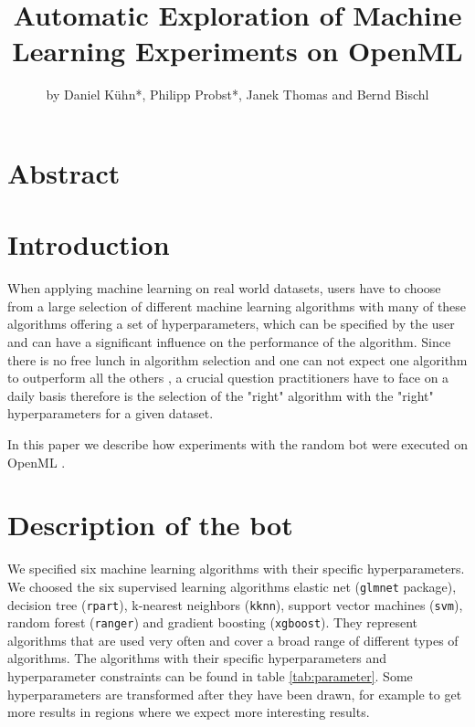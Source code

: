 \documentclass{article}
\begin{document}


\title{Automatic Exploration of Machine Learning Experiments on OpenML}
\author{by Daniel Kühn*, Philipp Probst*, Janek Thomas and Bernd Bischl}

\maketitle

\section{
Abstract
}

\section{Introduction}

When applying machine learning on real world datasets, users have to choose from a large selection of different machine learning algorithms with many of these algorithms offering a set of hyperparameters, which can be specified by the user and can have a significant influence on the performance of the algorithm. Since there is no free lunch in algorithm selection and one can not expect one algorithm to outperform all the others \citep{Wolpert2001}, a crucial question practitioners have to face on a daily basis therefore is the selection of the "right" algorithm with the "right" hyperparameters for a given dataset. 


In this paper we describe how experiments with the random bot were executed on OpenML \citep{OpenML2013}. 

\section{Description of the bot}

We specified six machine learning algorithms with their specific hyperparameters.
We choosed the six supervised learning algorithms elastic net (\texttt{glmnet} package), 
decision tree (\texttt{rpart}), k-nearest neighbors (\texttt{kknn}), 
support vector machines (\texttt{svm}), random forest (\texttt{ranger}) 
and gradient boosting (\texttt{xgboost}). They represent algorithms that are used very 
often and cover a broad range of different types of algorithms. 
The algorithms with their specific hyperparameters and hyperparameter constraints can 
be found in table \ref{tab:parameter}. Some hyperparameters are transformed after they have been drawn, 
for example to get more results in regions where we expect more interesting results. 
\end{document}
